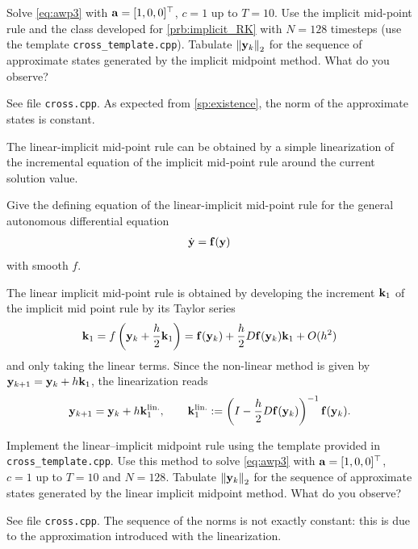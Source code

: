 \begin{problem}
\begin{subproblem}[2]
Solve \eqref{eq:awp3} with ${\mathbf{a}}=[1,0,0]^\top$, $c=1$ up to $T=10$. Use the implicit mid-point rule and the class developed for \ref{prb:implicit_RK} with $N=128$ timesteps (use the template \texttt{cross\_template.cpp}).  Tabulate $\left\lVert {\mathbf{y}}_k \right\rVert_2$ for the sequence of approximate states generated by the implicit midpoint method. What do you observe?
\begin{solution}
See file \texttt{cross.cpp}. As expected from \ref{sp:existence}, the norm of the approximate states is constant.
\end{solution}
\end{subproblem}

\begin{subproblem}[3] \label{sp:lin-imp-mpr}
The linear-implicit mid-point rule can be obtained
by a simple linearization of the incremental equation of the implicit mid-point rule around the current solution value.

Give the defining equation of the linear-implicit mid-point rule for the general autonomous differential equation
  \begin{gather*}
    \dot{{\mathbf{y}}} = {\mathbf{f}}({\mathbf{y}})
  \end{gather*}
  with smooth $f$.
  
\begin{solution}
The linear implicit mid-point rule is obtained by developing the increment ${\mathbf{k}}_1$ of the implicit mid point rule by its Taylor series
    \begin{align*}
      {\mathbf{k}}_1 = f \left({\mathbf{y}}_k+\frac{h}{2}{\mathbf{k}}_1\right)
      = {\mathbf{f}}({\mathbf{y}}_k) + \frac{h}{2}D{\mathbf{f}}({\mathbf{y}}_k){\mathbf{k}}_1 + O(h^2)
    \end{align*}
    and only taking the linear terms. Since the non-linear method is given by ${\mathbf{y}}_{k+1} = {\mathbf{y}}_k + h{\mathbf{k}}_1$, the linearization reads
    \begin{align*}
       {\mathbf{y}}_{k+1} = {\mathbf{y}}_k + h{\mathbf{k}}_1^{\text{lin.}}, \qquad  {\mathbf{k}}_1^{\text{lin.}} :=
      \left(I-\frac{h}{2}D{\mathbf{f}}({\mathbf{y}}_k)\right)^{-1}{\mathbf{f}}({\mathbf{y}}_k).
    \end{align*}
\end{solution}
\end{subproblem}

\begin{subproblem}[3]\label{sp:solve}
Implement the linear--implicit midpoint rule using the template provided in \texttt{cross\_template.cpp}.
Use this method to solve \eqref{eq:awp3} with ${\mathbf{a}}=[1,0,0]^\top$, $c=1$ up to $T=10$ and $N=128$. Tabulate $\left\lVert {\mathbf{y}}_k \right\rVert_2$ for the sequence of approximate states generated by the linear implicit midpoint method. What do you observe?
\begin{solution}
See file \texttt{cross.cpp}. The sequence of the norms is not exactly constant: this is due to the approximation introduced with the linearization.
\end{solution}
\end{subproblem}
\end{problem}




